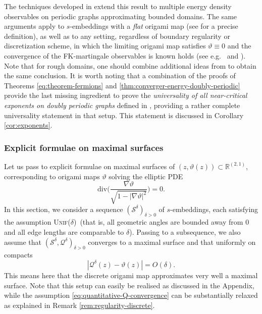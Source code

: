 \documentclass[reqno]{amsart}
\numberwithin{equation}{section}
\theoremstyle{definition}
\theoremstyle{remark}
\newcommand\cQ{\mathcal{Q}}
\newcommand\cS{\mathcal{S}}
\newcommand\Unif{{\mbox{\textsc{Unif(}$\delta$\textsc{)}}}}
\begin{document}
The techniques developed in \cite{HonPHD} extend this result to multiple energy density observables on periodic graphs approximating bounded domains. The same arguments apply to $s$-embeddings with a \emph{flat} origami map (see \cite{Che20} for a precise definition), as well as to any setting, regardless of boundary regularity or discretization scheme, in which the limiting origami map satisfies $\vartheta \equiv 0$ and the convergence of the FK-martingale observables is known holds (see e.g.\ \cite{Par25} and \cite[Chapter 6]{MahPHD}). Note that for rough domains, one should combine  additional ideas from \cite{park-iso,WanPHD} to obtain the same conclusion. 
It is worth noting that a combination of the proofs of Theorems \ref{eq:theorem-fermions} and  \ref{thm:converger-energy-doubly-periodic} provide the last missing ingredient to prove the \emph{universality of all near-critical exponents on doubly periodic graphs} defined in \cite[(R1-R7)]{FK_scaling_relations}, providing a rather complete universality statement in that setup. This statement is discussed in Corollary \ref{cor:exponents}. 
\medskip

\subsubsection{Explicit formulae on maximal surfaces} 

Let us pass to explicit formulae on maximal surfaces of $(z,\vartheta(z)) \subset \mathbb{R}^{(2,1)}$, corresponding to origami maps  $\vartheta$ solving the elliptic PDE
\begin{equation*}
	\textrm{div} \Big( \frac{\nabla \vartheta}{\sqrt{1-|\nabla \vartheta |^2}} \Big)=0.
\end{equation*}
In this section, we consider a sequence $(\cS^{\delta})_{\delta>0}$ of $s$-embeddings, each satisfying the assumption \Unif\ (that is, all geometric angles are bounded away from $0$ and all edge lengths are comparable to $\delta$). Passing to a subsequence, we also assume that $(\cS^\delta,\cQ^\delta)_{\delta>0}$ converges to a maximal surface and that uniformly on compacts 
\begin{equation}\label{eq:quantitative-Q-convergence}
	|\cQ^\delta(z) - \vartheta(z)| = O(\delta).
\end{equation}
This means here that the discrete origami map approximates very well a maximal surface. Note that this setup can easily be realised as discussed in the Appendix, while the assumption \eqref{eq:quantitative-Q-convergence} can be substantially relaxed as explained in Remark \ref{rem:regularity-discrete}. 
\end{document}
